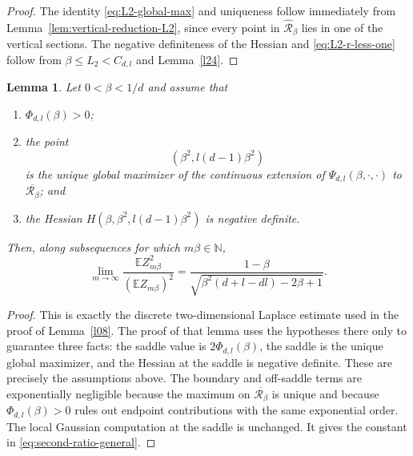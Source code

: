 \documentclass[11pt]{amsart}
\theoremstyle{plain}
\newtheorem{lemma}[theorem]{Lemma}
\numberwithin{equation}{section}
\numberwithin{theorem}{section}
\numberwithin{figure}{section}
\begin{document}
\begin{proof}
The identity \eqref{eq:L2-global-max} and uniqueness follow immediately from
Lemma~\ref{lem:vertical-reduction-L2}, since every point in
\(\widehat{\mathcal R}_\beta\) lies in one of the vertical sections.  The negative
definiteness of the Hessian and \eqref{eq:L2-r-less-one} follow from
\(\beta\le L_2<C_{d,l}\) and Lemma~\ref{l24}.
\end{proof}

\begin{lemma}\label{lem:second-moment-nondegenerate-global}
Let \(0<\beta<1/d\) and assume that
\begin{enumerate}
\item \(\Phi_{d,l}(\beta)>0\);
\item the point
      \[
        (\beta^2,l(d-1)\beta^2)
      \]
      is the unique global maximizer of the continuous extension of
      \(\Psi_{d,l}(\beta,\cdot,\cdot)\) to
      \(\overline{\mathcal R_\beta}\); and
\item the Hessian \(H(\beta,\beta^2,l(d-1)\beta^2)\) is negative definite.
\end{enumerate}
Then, along subsequences for which \(m\beta\in\mathbb N\),
\begin{equation}\label{eq:second-ratio-general}
  \lim_{m\to\infty}
  \frac{\mathbb E Z_{m\beta}^2}{(\mathbb E Z_{m\beta})^2}
  =\frac{1-\beta}{\sqrt{\beta^2(d+l-dl)-2\beta+1}}.
\end{equation}
\end{lemma}

\begin{proof}
This is exactly the discrete two-dimensional Laplace estimate used in the proof of
Lemma~\ref{l08}.  The proof of that lemma uses the hypotheses there only to guarantee
three facts: the saddle value is \(2\Phi_{d,l}(\beta)\), the saddle is the unique global
maximizer, and the Hessian at the saddle is negative definite.  These are precisely the
assumptions above.  The boundary and off-saddle terms are exponentially negligible because the
maximum on \(\overline{\mathcal R_\beta}\) is unique and because
\(\Phi_{d,l}(\beta)>0\) rules out endpoint contributions with the same exponential
order.  The local Gaussian computation at the saddle is unchanged.
It gives the constant in \eqref{eq:second-ratio-general}.
\end{proof}
\end{document}
